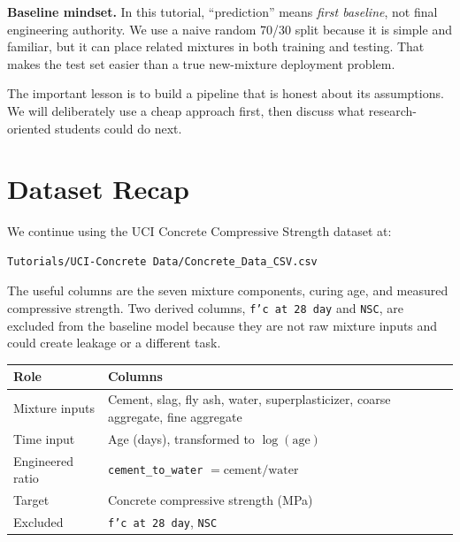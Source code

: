 \documentclass[11pt]{article}
\begin{document}
\begin{alert-box}
\textbf{Baseline mindset.}  In this tutorial, ``prediction'' means \emph{first baseline}, not final engineering authority.  We use a naive random 70/30 split because it is simple and familiar, but it can place related mixtures in both training and testing.  That makes the test set easier than a true new-mixture deployment problem.
\end{alert-box}

The important lesson is to build a pipeline that is honest about its assumptions.  We will deliberately use a cheap approach first, then discuss what research-oriented students could do next.

\section{Dataset Recap}
\label{sec:dataset-recap}

We continue using the UCI Concrete Compressive Strength dataset at:

\begin{lstlisting}[style=term]
Tutorials/UCI-Concrete Data/Concrete_Data_CSV.csv
\end{lstlisting}

The useful columns are the seven mixture components, curing age, and measured compressive strength.  Two derived columns, \texttt{f'c at 28 day} and \texttt{NSC}, are excluded from the baseline model because they are not raw mixture inputs and could create leakage or a different task.

\begin{center}
\begin{tabularx}{0.95\textwidth}{l X}
\toprule
\textbf{Role} & \textbf{Columns} \\
\midrule
Mixture inputs & Cement, slag, fly ash, water, superplasticizer, coarse aggregate, fine aggregate \\
Time input & Age (days), transformed to $\log(\text{age})$ \\
Engineered ratio & \texttt{cement\_to\_water} $= \text{cement}/\text{water}$ \\
Target & Concrete compressive strength (MPa) \\
Excluded & \texttt{f'c at 28 day}, \texttt{NSC} \\
\bottomrule
\end{tabularx}
\end{center}
\end{document}
